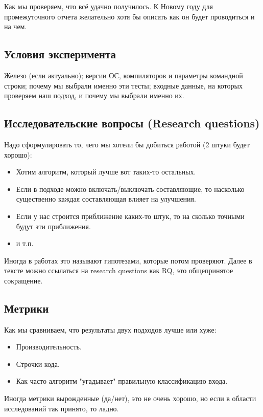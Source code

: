 
Как мы проверяем, что  всё удачно получилось.  К Новому году для промежуточного отчета желательно хотя бы описать как он будет проводиться и на чем.

\subsection{Условия эксперимента}
Железо (если актуально);  версии ОС, компиляторов и параметры командной строки; почему мы выбрали именно эти тесты; входные данные, на которых проверяем наш подход, и почему мы выбрали именно их.

\subsection{Исследовательские вопросы (Research questions)}
Надо сформулировать то, чего мы хотели бы добиться работой (2 штуки будет хорошо):

\begin{itemize}
\item Хотим алгоритм, который лучше вот таких-то остальных.
\item Если в подходе можно включать/выключать составляющие, то насколько существенно каждая составляющая влияет на улучшения.
\item Если у нас строится приближение каких-то штук, то на сколько точными будут эти приближения.
\item и т.п.
\end{itemize}

Иногда в работах это называют гипотезами, которые потом проверяют. Далее в тексте можно ссылаться на research questions как \textsc{RQ}, это общепринятое сокращение.

\subsection{Метрики}

Как мы сравниваем, что результаты двух подходов лучше или хуже:
\begin{itemize}
\item Производительность.
\item Строчки кода.
\item Как часто алгоритм "угадывает" правильную классификацию входа.
\end{itemize}

Иногда метрики вырожденные (да/нет), это не очень хорошо, но если в области исследований так принято, то ладно.

